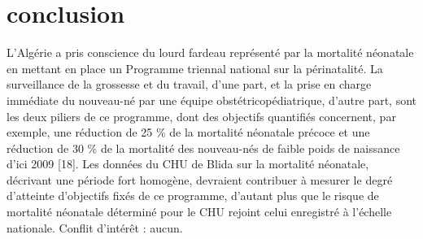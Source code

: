 \section{conclusion}
L’Algérie a pris conscience du lourd fardeau représenté par la
mortalité néonatale en mettant en place un Programme
triennal national sur la périnatalité. La surveillance de la
grossesse et du travail, d’une part, et la prise en charge
immédiate du nouveau-né par une équipe obstétricopédiatrique,
d’autre part, sont les deux piliers de ce programme,
dont des objectifs quantifiés concernent, par exemple, une
réduction de 25 \% de la mortalité néonatale précoce et une
réduction de 30 \% de la mortalité des nouveau-nés de faible
poids de naissance d’ici 2009 [18].
Les données du CHU de Blida sur la mortalité néonatale,
décrivant une période fort homogène, devraient contribuer
à mesurer le degré d’atteinte d’objectifs fixés de ce
programme, d’autant plus que le risque de mortalité
néonatale déterminé pour le CHU rejoint celui enregistré à
l’échelle nationale.
Conflit d’intérêt : aucun.	